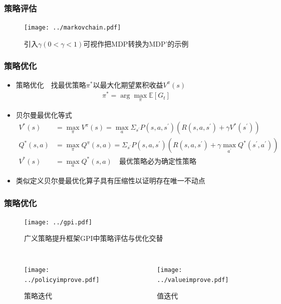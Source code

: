 \documentclass{beamer}
\begin{document}
\begin{CJK*}{GBK}{hei}
\begin{frame}\frametitle{策略评估}
    \begin{figure}[htbp]
       \centering\texttt{[image: ../markovchain.pdf]}
	   \caption{引入$\gamma(0<\gamma<1)$可视作把MDP转换为MDP'的示例}
    \end{figure}
\end{frame}

\begin{frame}\frametitle{策略优化}
\begin{itemize}
\item 策略优化~~找最优策略$\pi^{*}$以最大化期望累积收益$V^{\pi}(s)$
    \begin{align*}
        \pi^{*}=\arg \max _{\pi} \mathbb{E}[G_t]
    \end{align*}
\item 贝尔曼最优化等式
    {\small{
    \begin{align*}
        V^{*}(s) &=\max _{\pi} V^{\pi}(s)=\max _{a} \Sigma_{s^{\prime}} P\left(s, a, s^{\prime}\right)\left(R\left(s, a, s^{\prime}\right)+\gamma V^{*}\left(s^{\prime}\right)\right) \\
        Q^{*}(s, a) &=\max _{\pi} Q^{\pi}(s, a)=\Sigma_{s^{\prime}} P\left(s, a, s^{\prime}\right)\left(R\left(s, a, s^{\prime}\right)+\gamma \max _{a^{\prime}} Q^{*}\left(s^{\prime}, a^{\prime}\right)\right)\\
        V^{*}(s)&=\max_{a}Q^{*}(s, a)\quad \scriptstyle{\text{最优策略必为确定性策略}}
    \end{align*}
    }}
\item 类似定义贝尔曼最优化算子具有压缩性以证明存在唯一不动点
\end{itemize}
\end{frame}

\begin{frame}\frametitle{策略优化}
    \begin{figure}[htbp]
       \centering\texttt{[image: ../gpi.pdf]}
	   \caption{广义策略提升框架GPI中策略评估与优化交替\citep{sutton2018reinforcement}}
    \end{figure}
    \begin{columns}
            \begin{figure}[htbp]
       \centering\texttt{[image: ../policyimprove.pdf]}
	   \caption{策略迭代}
    \end{figure}
                    \begin{figure}[htbp]
       \centering\texttt{[image: ../valueimprove.pdf]}
	   \caption{值迭代}
    \end{figure}
    \end{columns}
\end{frame}


\end{CJK*}
\end{document}

